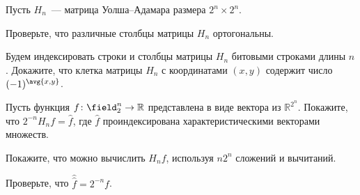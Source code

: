 Пусть $H_n$~--- матрица Уолша--Адамара размера $2^n \times 2^n$.

\begin{enumcyr}
    \item Проверьте, что различные столбцы матрицы $H_n$ ортогональны.
    \item Будем индексировать строки и столбцы матрицы $H_n$ битовыми строками длины $n$. Докажите, что
        клетка матрицы $H_n$ с координатами $(x, y)$ содержит число $(-1)^{\avg{x, y}}$.
    \item Пусть функция $f\colon \field_2^n \to \mathbb{R}$ представлена в виде вектора из
        $\mathbb{R}^{2^n}$. Покажите, что $2^{-n} H_n f = \hat{f}$, где $\hat{f}$ проиндексирована
        характеристическими векторами множеств.
    \item Покажите, что можно вычислить $H_n f$, используя $n 2^n$ сложений и вычитаний.
    \item Проверьте, что $\hat {\hat f} = 2^{-n}f$.
\end{enumcyr}